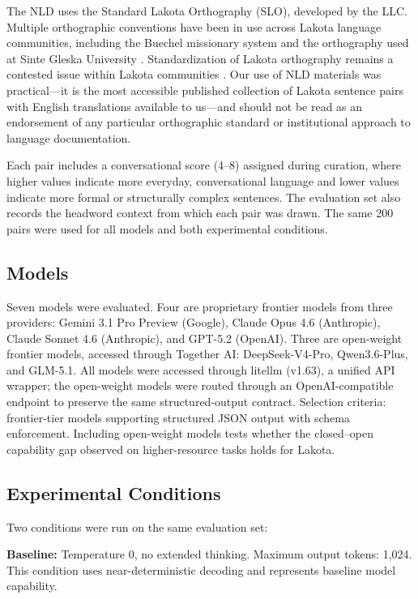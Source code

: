 \documentclass[11pt]{article}
\begin{document}
The NLD uses the Standard Lakota Orthography (SLO), developed by the LLC. Multiple orthographic conventions have been in use across Lakota language communities, including the Buechel missionary system and the orthography used at Sinte Gleska University \cite{whitehat}. Standardization of Lakota orthography remains a contested issue within Lakota communities \cite{hauff}. Our use of NLD materials was practical---it is the most accessible published collection of Lakota sentence pairs with English translations available to us---and should not be read as an endorsement of any particular orthographic standard or institutional approach to language documentation.

Each pair includes a conversational score (4--8) assigned during curation, where higher values indicate more everyday, conversational language and lower values indicate more formal or structurally complex sentences. The evaluation set also records the headword context from which each pair was drawn. The same 200 pairs were used for all models and both experimental conditions.

\subsection{Models}

Seven models were evaluated. Four are proprietary frontier models from three providers: Gemini 3.1 Pro Preview (Google), Claude Opus 4.6 (Anthropic), Claude Sonnet 4.6 (Anthropic), and GPT-5.2 (OpenAI). Three are open-weight frontier models, accessed through Together AI: DeepSeek-V4-Pro, Qwen3.6-Plus, and GLM-5.1. All models were accessed through litellm (v1.63), a unified API wrapper; the open-weight models were routed through an OpenAI-compatible endpoint to preserve the same structured-output contract. Selection criteria: frontier-tier models supporting structured JSON output with schema enforcement. Including open-weight models tests whether the closed--open capability gap observed on higher-resource tasks holds for Lakota.

\subsection{Experimental Conditions}

Two conditions were run on the same evaluation set:

\textbf{Baseline:} Temperature 0, no extended thinking. Maximum output tokens: 1,024. This condition uses near-deterministic decoding and represents baseline model capability.
\end{document}
